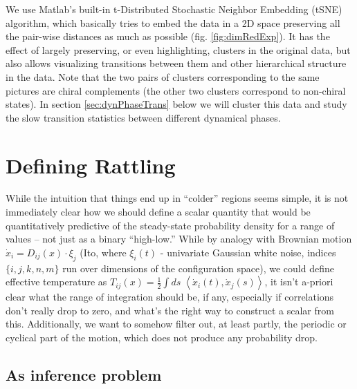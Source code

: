 \documentclass[reprint,prx]{revtex4-1}
\renewcommand{\=}[1]{\stackrel{#1}{=}} %
\renewcommand{\(}{\left (}
\renewcommand{\)}{\right  )}
\renewcommand{\[}{\left [}
\renewcommand{\]}{\right ]}
\newcommand{\<}{\left <}
\renewcommand{\>}{\right >}
\theoremstyle{definition}
\theoremstyle{remark}
\begin{document}
We use Matlab's built-in t-Distributed Stochastic Neighbor Embedding (tSNE) algorithm, which basically tries to embed the data in a 2D space preserving all the pair-wise distances as much as possible (fig. \ref{fig:dimRedExp}). It has the effect of largely preserving, or even highlighting, clusters in the original data, but also allows visualizing transitions between them and other hierarchical structure in the data. Note that the two pairs of clusters corresponding to the same pictures are chiral complements (the other two clusters correspond to non-chiral states). In section \ref{sec:dynPhaseTrans} below we will cluster this data and study the slow transition statistics between different dynamical phases.

\section{Defining Rattling} \label{app:defRatt}

While the intuition that things end up in ``colder'' regions seems simple, it is not immediately clear how we should define a scalar quantity that would be quantitatively predictive of the steady-state probability density for a range of values -- not just as a binary ``high-low.'' While by analogy with Brownian motion $ \dot{x}_i = D_{ij}(x)\cdot \xi_j $ (Ito, where $ \xi_i(t) $ - univariate Gaussian white noise, indices $ \{i,j,k,n,m\} $ run over dimensions of the configuration space), we could define effective temperature as $ T_{ij}(x) = \frac{1}{2}\int ds \; \<\dot{x}_i(t),\dot{x}_j(s) \> $, it isn't a-priori clear what the range of integration should be, if any, especially if correlations don't really drop to zero, and what's the right way to construct a scalar from this. Additionally, we want to somehow filter out, at least partly, the periodic or cyclical part of the motion, which does not produce any probability drop. 

\subsection{As inference problem}
\end{document}
